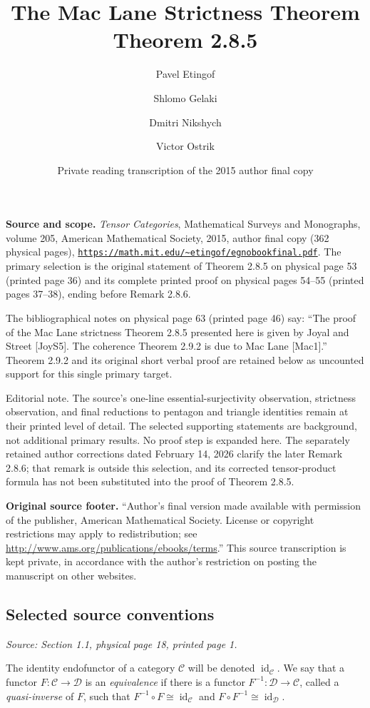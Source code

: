 \documentclass[11pt]{article}
\title{The Mac Lane Strictness Theorem\\Theorem 2.8.5}
\author{Pavel Etingof \and Shlomo Gelaki \and Dmitri Nikshych \and Victor Ostrik}
\date{Private reading transcription of the 2015 author final copy}
\newcommand{\cC}{\mathcal C}
\newcommand{\cD}{\mathcal D}
\newcommand{\id}{\operatorname{id}}
\newcommand{\sourceloc}[1]{\par\smallskip\noindent\textit{Source: #1.}\par\nopagebreak[4]\smallskip}
\newcommand{\editorial}[1]{\par\smallskip\noindent\textsf{Editorial note.} #1\par\smallskip}
\begin{document}
\maketitle

\noindent\textbf{Source and scope.}
\emph{Tensor Categories}, Mathematical Surveys and Monographs, volume 205,
American Mathematical Society, 2015, author final copy (362 physical pages),
\href{https://math.mit.edu/~etingof/egnobookfinal.pdf}{\nolinkurl{https://math.mit.edu/~etingof/egnobookfinal.pdf}}.
The primary selection is the original statement of Theorem 2.8.5 on physical
page 53 (printed page 36) and its complete printed proof on physical pages
54--55 (printed pages 37--38), ending before Remark 2.8.6.

The bibliographical notes on physical page 63 (printed page 46) say:
``The proof of the Mac Lane strictness Theorem 2.8.5 presented here is given
by Joyal and Street [JoyS5]. The coherence Theorem 2.9.2 is due to Mac Lane
[Mac1].'' Theorem 2.9.2 and its original short verbal proof are retained
below as uncounted support for this single primary target.

\editorial{The source's one-line essential-surjectivity observation,
strictness observation, and final reductions to pentagon and triangle
identities remain at their printed level of detail. The selected supporting
statements are background, not additional primary results. No proof step is
expanded here. The separately retained author corrections dated February 14,
2026 clarify the later Remark 2.8.6; that remark is outside this selection,
and its corrected tensor-product formula has not been substituted into the
proof of Theorem 2.8.5.}

\noindent\textbf{Original source footer.}
``Author's final version made available with permission of the publisher,
American Mathematical Society. License or copyright restrictions may apply
to redistribution; see \url{http://www.ams.org/publications/ebooks/terms}.''
This source transcription is kept private, in accordance with the author's
restriction on posting the manuscript on other websites.

\subsection*{Selected source conventions}
\sourceloc{Section 1.1, physical page 18, printed page 1}
The identity endofunctor of a category $\cC$ will be denoted $\id_{\cC}$.
We say that a functor $F:\cC\to\cD$ is an \emph{equivalence} if there is a
functor $F^{-1}:\cD\to\cC$, called a \emph{quasi-inverse} of $F$, such that
$F^{-1}\circ F\cong\id_{\cC}$ and $F\circ F^{-1}\cong\id_{\cD}$.
\end{document}
